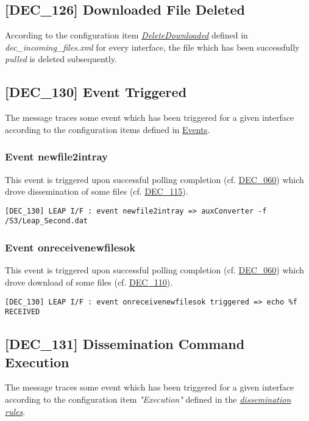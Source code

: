 \documentclass[dec_sum_main.tex]{subfiles}
\begin{document}
\label{DEC126}
\subsection{[DEC\_126] Downloaded File Deleted}
According to the configuration item \hyperref[DeleteFlag]{\textit{DeleteDownloaded}} defined in \textit{dec\_incoming\_files.xml} for every interface, the file which has been successfully \textit{pulled} is deleted subsequently.

\subsection{[DEC\_130] Event Triggered}
The message traces some event which has been triggered for a given interface according to the configuration items defined in \hyperref[Events]{Events}.

\subsubsection{Event newfile2intray}
This event is triggered upon successful polling completion (cf. \hyperref[DEC060]{DEC\_060}) which drove dissemination of some files (cf. \hyperref[DEC115]{DEC\_115}).
\begin{verbatim}
[DEC_130] LEAP I/F : event newfile2intray => auxConverter -f /S3/Leap_Second.dat
\end{verbatim}

\subsubsection{Event onreceivenewfilesok}
This event is triggered upon successful polling completion (cf. \hyperref[DEC060]{DEC\_060}) which drove download of some files (cf. \hyperref[DEC110]{DEC\_110}).
\begin{verbatim}
[DEC_130] LEAP I/F : event onreceivenewfilesok triggered => echo %f RECEIVED
\end{verbatim}

\subsection{[DEC\_131] Dissemination Command Execution }
The message traces some event which has been triggered for a given interface according to the configuration item \textit{"Execution"} defined in the \hyperref[Dissemination rules]{\textit{dissemination rules}}.

\label{DEC144}
\end{document}
